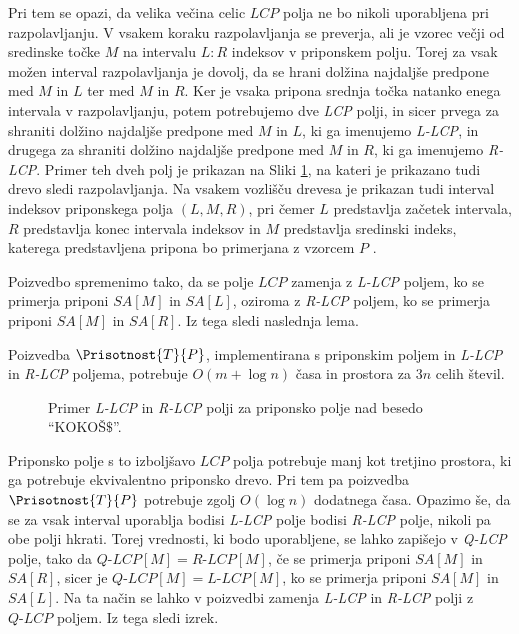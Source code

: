 Pri tem se opazi, da velika večina celic $LCP$ polja ne bo nikoli uporabljena pri razpolavljanju. V vsakem koraku razpolavljanja se preverja, ali je vzorec večji od sredinske točke $M$ na intervalu $L:R$ indeksov v priponskem polju. Torej za vsak možen interval razpolavljanja je dovolj, da se hrani dolžina najdaljše predpone med $M$ in $L$ ter med $M$ in $R$. Ker je vsaka pripona srednja točka natanko enega intervala v razpolavljanju, potem potrebujemo dve \textit{LCP} polji, in sicer prvega za shraniti dolžino najdaljše predpone med $M$ in $L$, ki ga imenujemo \textit{L-LCP}, in drugega za shraniti dolžino najdaljše predpone med $M$ in $R$, ki ga imenujemo \textit{R-LCP}. Primer teh dveh polj je prikazan na Sliki \ref{fig:RlcpLlcpSuffuxArray}, na kateri je prikazano tudi drevo sledi razpolavljanja. Na vsakem vozlišču drevesa je prikazan tudi interval indeksov priponskega polja $(L,M,R)$, pri čemer $L$ predstavlja začetek intervala, $R$ predstavlja konec intervala indeksov in $M$ predstavlja sredinski indeks, katerega predstavljena pripona bo primerjana z vzorcem $P$ \cite{Manber1990}. 

Poizvedbo spremenimo tako, da se polje $LCP$ zamenja z \textit{L-LCP} poljem, ko se primerja priponi $SA[M]$ in $SA[L]$, oziroma z \textit{R-LCP} poljem, ko se primerja priponi $SA[M]$ in $SA[R]$. Iz tega sledi naslednja lema.

\begin{lema}\label{lema:LRLCP}
    Poizvedba $\Prisotnost{T}{P}$, implementirana s priponskim poljem in \textit{L-LCP} in \textit{R-LCP} poljema, potrebuje $O(m+\log{n})$ časa in prostora za $3n$ celih števil.
\end{lema}

\begin{figure}[tb] 
    
    \centering
    \caption{Primer \textit{L-LCP} in \textit{R-LCP} polji za priponsko polje nad besedo \enquote{KOKOŠ$\$$}.} 
    \label{fig:RlcpLlcpSuffuxArray}
\end{figure}

Priponsko polje s to izboljšavo $LCP$ polja potrebuje manj kot tretjino prostora, ki ga potrebuje ekvivalentno priponsko drevo. Pri tem pa poizvedba $\Prisotnost{T}{P}$ potrebuje zgolj $O(\log{n})$ dodatnega časa. Opazimo še, da se za vsak interval uporablja bodisi \textit{L-LCP} polje bodisi \textit{R-LCP} polje, nikoli pa obe polji hkrati. Torej vrednosti, ki bodo uporabljene, se lahko zapišejo v \textit{Q-LCP} polje, tako da $\textit{Q-LCP}[M]= \textit{R-LCP}[M]$, če se primerja priponi $SA[M]$ in $SA[R]$, sicer je $\textit{Q-LCP}[M]= \textit{L-LCP}[M]$, ko se primerja priponi $SA[M]$ in $SA[L]$. Na ta način se lahko v poizvedbi zamenja \textit{L-LCP} in \textit{R-LCP} polji z $\textit{Q-LCP}$ poljem. Iz tega sledi izrek.

